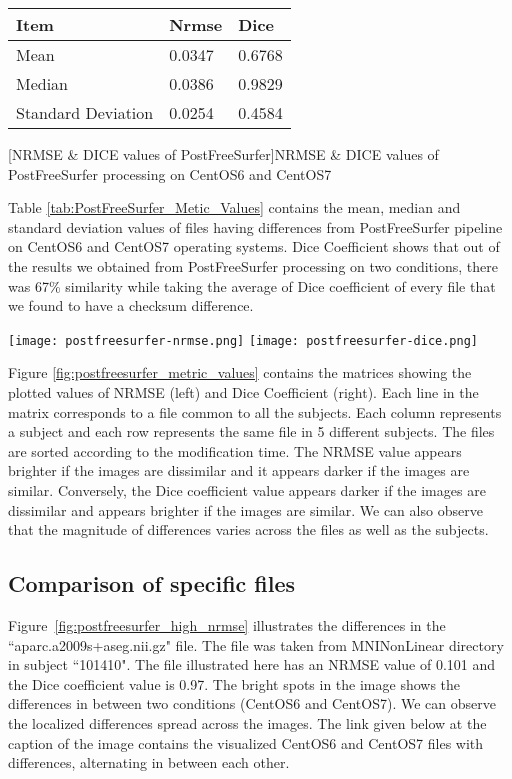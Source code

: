 \begin{center}
\begin{tabular}{|l|l|l|}
\hline
\textbf{Item}      & \textbf{Nrmse} & \textbf{Dice} \\ \hline
Mean               & 0.0347     & 0.6768   \\ \hline
Median             & 0.0386    & 0.9829   \\ \hline
Standard Deviation & 0.0254    & 0.4584   \\ \hline
\end{tabular}
  [NRMSE \& DICE values of PostFreeSurfer]{NRMSE \& DICE values of PostFreeSurfer processing on CentOS6 and CentOS7}
\label{tab:PostFreeSurfer_Metic_Values}
\end{center}

Table \ref{tab:PostFreeSurfer_Metic_Values} contains the mean, median and standard deviation values of files having differences from PostFreeSurfer pipeline on CentOS6 and CentOS7 operating systems. Dice Coefficient shows that out of the results we obtained from PostFreeSurfer processing on two conditions, there was 67\% similarity while taking the average of Dice coefficient of every file that we found to have a checksum difference.

\begin{center}
\texttt{[image: postfreesurfer-nrmse.png]}%
\texttt{[image: postfreesurfer-dice.png]}
\caption*{(i) NRMSE (left) (ii)Dice Coefficient (right)}
\label{fig:postfreesurfer_metric_values}
\end{center}

Figure \ref{fig:postfreesurfer_metric_values} contains the matrices showing the plotted values of NRMSE (left) and Dice Coefficient (right). Each line in the matrix corresponds to a file common to all the subjects. Each column represents a subject and each row represents the same file in 5 different subjects. The files are sorted according to the modification time. The NRMSE value appears brighter if the images are dissimilar and it appears darker if the images are similar. Conversely, the Dice coefficient value appears darker if the images are dissimilar and appears brighter if the images are similar. We can also observe that the magnitude of differences varies across the files as well as the subjects.

\subsection{Comparison of specific files}
Figure~\ref{fig:postfreesurfer_high_nrmse} illustrates the differences in the ``aparc.a2009s+aseg.nii.gz" file. The file was taken from MNINonLinear directory in subject ``101410". The file illustrated here has an NRMSE value of 0.101 and the Dice coefficient value is 0.97. The bright spots in the image shows the differences in between two conditions (CentOS6 and CentOS7). We can observe the localized differences spread across the images. The link given below at the caption of the image contains the visualized CentOS6 and CentOS7 files with differences, alternating in between each other.

